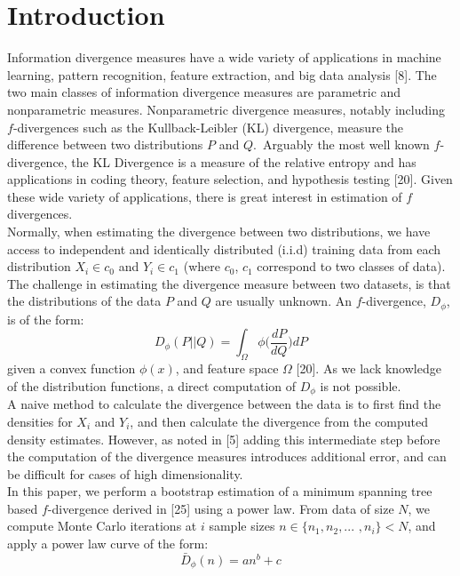 \documentclass{article}
\begin{document}
	\section{Introduction} 
	Information divergence measures have a wide variety of applications in machine learning, pattern recognition, feature extraction, and big data analysis [8]. The two main classes of information divergence measures are parametric and nonparametric measures. Nonparametric divergence measures, notably including $f$-divergences such as the Kullback-Leibler (KL) divergence,  measure the difference between two distributions $P$ and $Q$.\ Arguably the most well known $f$-divergence, the KL Divergence is a measure of the relative entropy and has applications in coding theory, feature selection, and hypothesis testing [20].	Given these wide variety of applications, there is great interest in estimation of $f$ divergences.
	\\ [0.5ex] %
	\indent Normally, when estimating the divergence between two distributions, we have access to independent and identically distributed (i.i.d) training data from each distribution $X_i \in c_0$ and $Y_i \in c_1$ (where $c_0$, $c_1$ correspond to two classes of data). The challenge in estimating the divergence measure between two datasets, is that the distributions of the data $P$ and $Q$ are usually unknown. An $f$-divergence, $D_\phi$, is of the form: \begin{equation} D_\phi(P\vert \vert Q) = \int_{\Omega} \phi\bigg(\frac{dP}{dQ}\bigg)dP \end{equation} given a convex function $\phi(x)$, and feature space $\Omega$ [20].
 	As we lack knowledge of the distribution functions, a direct computation of $D_\phi$ is not possible.
 	\\ [0.5ex]
 	\indent A naive method to calculate the divergence between the data is to first find the densities for $X_i$ and $Y_i$, and then calculate the divergence from the computed density estimates. However, as noted in [5] adding this intermediate step before the computation of the divergence measures introduces additional error, and can be difficult for cases of high dimensionality. 
	\\ [0.5ex]
	\indent	In this paper, we perform a bootstrap estimation of a minimum spanning tree based $f$-divergence derived in [25] using a power law. From data of size $N$, we compute  Monte Carlo iterations at $i$ sample sizes $n\in \{n_1, n_2,... $ $,n_i\}<N$, and apply a power law curve of the form: \begin{equation}
 	\bar{D}_\phi(n)=an^b+c
 	\end{equation}
\end{document}
